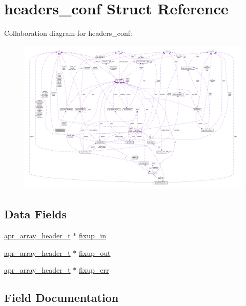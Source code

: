\hypertarget{structheaders__conf}{}\section{headers\+\_\+conf Struct Reference}
\label{structheaders__conf}


Collaboration diagram for headers\+\_\+conf\+:
\nopagebreak
\begin{figure}[H]
\begin{center}
\leavevmode
\includegraphics[width=350pt]{structheaders__conf__coll__graph}
\end{center}
\end{figure}
\subsection*{Data Fields}
\begin{DoxyCompactItemize}
\item 
\hyperlink{structapr__array__header__t}{apr\+\_\+array\+\_\+header\+\_\+t} $\ast$ \hyperlink{structheaders__conf_a0d9d82ebef3c748e93e881ae50f0e267}{fixup\+\_\+in}
\item 
\hyperlink{structapr__array__header__t}{apr\+\_\+array\+\_\+header\+\_\+t} $\ast$ \hyperlink{structheaders__conf_a6b51c1582b3948a44a80c1064acd65aa}{fixup\+\_\+out}
\item 
\hyperlink{structapr__array__header__t}{apr\+\_\+array\+\_\+header\+\_\+t} $\ast$ \hyperlink{structheaders__conf_a7ff6647cf1dc4383b658b1ce8e485dcc}{fixup\+\_\+err}
\end{DoxyCompactItemize}


\subsection{Field Documentation}

